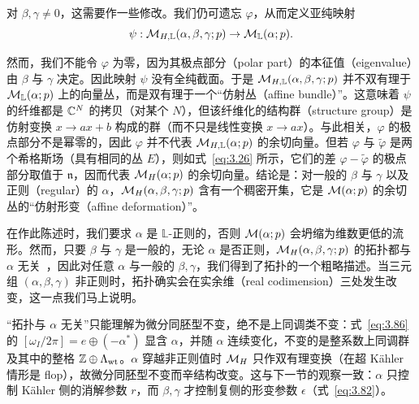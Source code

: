 对 $\beta,\gamma\not=0$，这需要作一些修改。我们仍可遗忘 $\varphi$，从而定义亚纯映射
\setcounter{equation}{73}
\begin{equation}\label{eq:3.74}
  \psi:{\mathcal{M}}_{H,\mathbb{L}}(\alpha,\beta,\gamma;p)\to {\mathcal{M}}_\mathbb{L}(\alpha;p).
\end{equation}

然而，我们不能令 $\varphi$ 为零，因为其极点部分（polar part）的本征值（eigenvalue）由 $\beta$ 与 $\gamma$ 决定。因此映射 $\psi$ 没有全纯截面。于是 ${\mathcal{M}}_{H,\mathbb{L}}(\alpha,\beta,\gamma;p)$ 并不双有理于 ${\mathcal{M}}_\mathbb{L}(\alpha;p)$ 上的向量丛，而是双有理于一个“仿射丛（affine bundle）”。这意味着 $\psi$ 的纤维都是 ${\mathbb{C}}^N$ 的拷贝（对某个 $N$），但该纤维化的结构群（structure group）是仿射变换 $x\to ax+b$ 构成的群（而不只是线性变换 $x\to ax$）。与此相关，$\varphi$ 的极点部分不是幂零的，因此 $\varphi$ 并不代表 ${\mathcal{M}}_{H,\mathbb{L}}(\alpha;p)$ 的余切向量。但若 $\varphi$ 与 $\tilde\varphi$ 是两个希格斯场（具有相同的丛 $E$），则如式~\eqref{eq:3.26} 所示，它们的差 $\varphi-\tilde\varphi$ 的极点部分取值于 $\mathfrak n$，因而代表 ${{\mathcal{M}}_H}(\alpha;p)$ 的余切向量。结论是：对一般的 $\beta$ 与 $\gamma$ 以及正则（regular）的 $\alpha$，${{\mathcal{M}}_H}(\alpha,\beta,\gamma;p)$ 含有一个稠密开集，它是 ${\mathcal{M}}(\alpha;p)$ 的余切丛的“仿射形变（affine deformation）”。

在作此陈述时，我们要求 $\alpha$ 是 $\mathbb{L}$-正则的，否则 ${\mathcal{M}}(\alpha;p)$ 会坍缩为维数更低的流形。然而，只要 $\beta$ 与 $\gamma$ 是一般的，无论 $\alpha$ 是否正则，${{\mathcal{M}}_H}(\alpha,\beta,\gamma;p)$ 的拓扑都与 $\alpha$ 无关~\cite{ref24}，因此对任意 $\alpha$ 与一般的 $\beta,\gamma$，我们得到了拓扑的一个粗略描述。当三元组 $(\alpha,\beta,\gamma)$ 非正则时，拓扑确实会在实余维（real codimension）三处发生改变，这一点我们马上说明。

\begin{yizhu}[易错点]
“拓扑与 $\alpha$ 无关”只能理解为微分同胚型不变，绝不是上同调类不变：式~\eqref{eq:3.86} 的 $[\omega_I/2\pi]=e\oplus(-\alpha^*)$ 显含 $\alpha$，并随 $\alpha$ 连续变化，不变的是整系数上同调群及其中的整格 ${\mathbb{Z}}\oplus\Lambda_{\rm wt}$。$\alpha$ 穿越非正则值时 ${{\mathcal{M}}_H}$ 只作双有理变换（在超 Kähler 情形是 flop），故微分同胚型不变而辛结构改变。这与下一节的观察一致：$\alpha$ 只控制 Kähler 侧的消解参数 $r$，而 $\beta,\gamma$ 才控制复侧的形变参数 $\epsilon$（式~\eqref{eq:3.82}）。
\end{yizhu}

